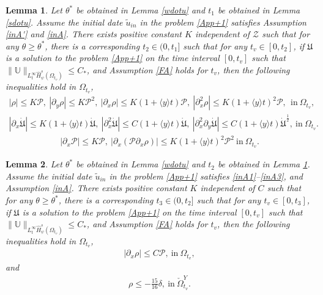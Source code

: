 \documentclass[10pt,a4paper]{amsart}
\newtheorem{lemma}{Lemma}
\newcommand\y{{{\langle y \rangle}}}
\begin{document}
\begin{lemma}\label{rhoP}
Let $\theta^{*}$ be obtained in Lemma \ref{wdotu} and $t_{1}$ be obtained in Lemma \ref{sdotu}.
Assume the initial date $\tilde{u}_{in}$ in the problem \eqref{App+1} satisfies Assumption \ref{inA'} and \ref{inA}.
There exists positive constant $K$ independent of $\mathcal{Z}$ such that for any $\theta\geq\theta^{*}$, there is a corresponding $t_{2}\in(0,t_{1}]$ such that for any $t_{v}\in[0,t_{2}]$, if $\mathfrak{U}$ is a solution to the problem \eqref{App+1} on the time interval $[0,t_{v}]$ such that
$\|\mathbb{U}\|_{L_{t}^{\infty}\hat{H}_{\psi}^{s}(\Omega_{t_{v}})}\leq C_{*}$,
and Assumption \ref{FA} holds for $t_{v}$, then the following inequalities hold in $\Omega_{t_{v}}$,
\begin{align}\label{rhop1}
|\rho|\leq K\mathcal{P},~
|\partial_{y}\rho|\leq K\mathcal{P}^{2},~
|\partial_{x}\rho|\leq K(1+\y t)\mathcal{P},~
|\partial_{x}^{2}\rho|\leq K(1+\y t)^{2}\mathcal{P},~
~\text{in}~\Omega_{t_{v}},
\end{align}
\begin{align}\label{rhop2}
|\partial_{x}\dot{\mathfrak{U}}|\leq K(1+\y t)\dot{\mathfrak{U}},~
|\partial_{x}^{2}\dot{\mathfrak{U}}|\leq C(1+\y t)\dot{\mathfrak{U}},~
|\partial_{x}^{2}\partial_{y}\dot{\mathfrak{U}}|\leq C(1+\y t)\dot{\mathfrak{U}}^{\frac{1}{2}},~\text{in}~\Omega_{t_{v}}.
\end{align}
\begin{align}\label{rhop3}
|\partial_{x}\mathcal{P}|\leq K\mathcal{P},~
\left|\partial_{x}(\mathcal{P}\partial_{x}\rho)\right|\leq K(1+\y t)^{2}\mathcal{P}^{2}~\text{in}~\Omega_{t_{v}}.
\end{align}
\end{lemma}

\begin{lemma}\label{rhoP'}
Let $\theta^{*}$ be obtained in Lemma \ref{wdotu} and $t_{2}$ be obtained in Lemma \ref{rhoP}.
Assume the initial date $\tilde{u}_{in}$ in the problem \eqref{App+1} satisfies \eqref{inA1}--\eqref{inA3}, and Assumption \ref{inA}.
There exists positive constant $K$ independent of $C$ such that for any $\theta\geq\theta^{*}$, there is a corresponding $t_{3}\in(0,t_{2}]$ such that for any $t_{v}\in[0,t_{3}]$, if $\mathfrak{U}$ is a solution to the problem \eqref{App+1} on the time interval $[0,t_{v}]$ such that
$\|\mathbb{U}\|_{L_{t}^{\infty}\hat{H}_{\psi}^{s}(\Omega_{t_{v}})}\leq C_{*}$,
and Assumption \ref{FA} holds for $t_{v}$, then the following inequalities hold in $\Omega_{t_{v}}$,
\begin{align}\label{rhox}
|\partial_{x}\rho|\leq C\mathcal{P},~\text{in}~\Omega_{t_{v}},
\end{align}
and
\begin{align}\label{rhol}
\rho\leq -\frac{15}{16}\delta,~\text{in}~\check{\Omega}_{t_{v}}^{Y}.
\end{align}

\end{lemma}
\end{document}
